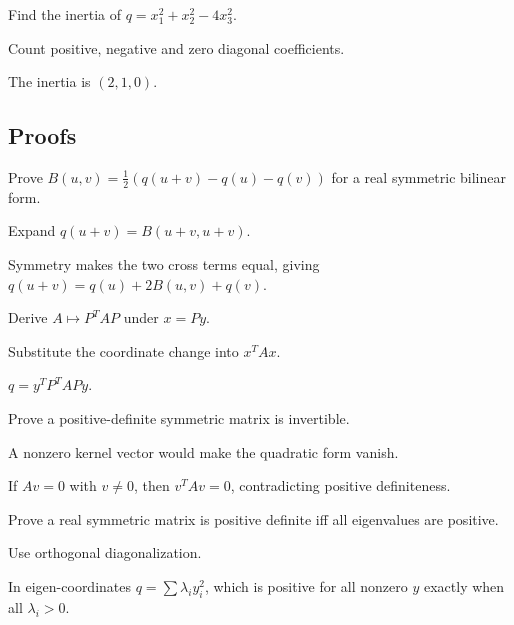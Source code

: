 \begin{exercise}[Inertia]\label{exr:i17-expand-05}
Find the inertia of \(q=x_1^2+x_2^2-4x_3^2\).
\end{exercise}
\begin{hint}
Count positive, negative and zero diagonal coefficients.
\end{hint}
\begin{solution}
The inertia is \((2,1,0)\).
\end{solution}

\subsection*{Proofs}

\begin{exercise}[Polarization]\label{exr:i17-expand-06}
Prove \(B(u,v)=\frac12(q(u+v)-q(u)-q(v))\) for a real symmetric bilinear form.
\end{exercise}
\begin{hint}
Expand \(q(u+v)=B(u+v,u+v)\).
\end{hint}
\begin{solution}
Symmetry makes the two cross terms equal, giving \(q(u+v)=q(u)+2B(u,v)+q(v)\).
\end{solution}

\begin{exercise}\label{exr:i17-expand-07}
Derive \(A\mapsto P^TAP\) under \(x=Py\).
\end{exercise}
\begin{hint}
Substitute the coordinate change into \(x^TAx\).
\end{hint}
\begin{solution}
\(q=y^TP^TAPy\).
\end{solution}

\begin{exercise}\label{exr:i17-expand-08}
Prove a positive-definite symmetric matrix is invertible.
\end{exercise}
\begin{hint}
A nonzero kernel vector would make the quadratic form vanish.
\end{hint}
\begin{solution}
If \(Av=0\) with \(v\ne0\), then \(v^TAv=0\), contradicting positive definiteness.
\end{solution}

\begin{exercise}\label{exr:i17-expand-09}
Prove a real symmetric matrix is positive definite iff all eigenvalues are positive.
\end{exercise}
\begin{hint}
Use orthogonal diagonalization.
\end{hint}
\begin{solution}
In eigen-coordinates \(q=\sum\lambda_i y_i^2\), which is positive for all nonzero \(y\) exactly when all \(\lambda_i>0\).
\end{solution}

